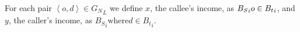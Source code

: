 For each pair \( \left< o, d \right> \in {G_N}_L \) we define \( x \), the callee's income, as \( {B_S}_i \\ o \in {B_t}_i \), and \( y \), the caller's income, as \( {B_S}_i \text{where} d \in {B_t}_i \).